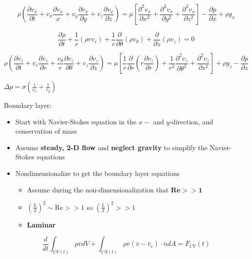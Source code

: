 \begin{equation*}
  \rho\left(\frac{\partial{}v_{x}}{\partial{}t}+v_{x}\frac{\partial{}v_{x}}{x}+v_{y}\frac{\partial{}v_{x}}{\partial{}y}+v_{z}\frac{\partial{}v_{x}}{\partial{}z}\right)=\mu\left[\frac{\partial^{2}v_{x}}{\partial{}x^{2}}+\frac{\partial^{2}v_{x}}{\partial{}y^{2}}+\frac{\partial^{2}v_{x}}{\partial{}z^{2}}\right]-\frac{\partial{}p}{\partial{}x}+\rho{}g_{x}
\end{equation*}

\begin{equation*}
  \frac{\partial\rho}{\partial{}t}+\frac{1}{r}(\rho{}rv_{r})+\frac{1}{r}\frac{\partial}{\partial\theta}(\rho{}v_{\theta})+\frac{\partial}{\partial{}z}(\rho{}v_{z})=0
\end{equation*}

\begin{equation*}
  \rho\left(\frac{\partial{}v_{z}}{\partial{}t}+v_{r}\frac{\partial{}v_{z}}{\partial{}r}+\frac{v_{\theta}}{r}\frac{\partial{}v_{z}}{\partial\theta}+v_{z}\frac{\partial{}v_{z}}{\partial{}z}\right)=\mu\left[\frac{1}{r}\frac{\partial}{\partial{}r}\left(r\frac{\partial{}v_{z}}{\partial{}r}\right)+\frac{1}{r^{2}}\frac{\partial^{2}v_{z}}{\partial\theta^{2}}+\frac{\partial^{2}v_{z}}{\partial{}z^{2}}\right]+\rho{}g_{z}-\frac{\partial{}p}{\partial{}z}
\end{equation*}

$\Delta{}p=\sigma\left(\frac{1}{r_{x}}+\frac{1}{r_{y}}\right)$

Boundary layer:
\begin{itemize}
  \setlength{\itemsep}{-4pt}
  \item{Start with Navier-Stokes equation in the $x-$ and $y$-direction, and conservation of mass}
  \item{Assume \textbf{steady, 2-D flow} and \textbf{neglect gravity} to simplify the Navier-Stokes equations}
  \item{Nondimensionalize to get the boundary layer equations}
  \begin{itemize}
    \item{Assume during the non-dimensionalization that $\textbf{Re}\mathbf{>>1}$}
    \item{$\left(\frac{L}{\delta}\right)^{2}\sim\text{Re}>>1$ so $\left(\frac{L}{\delta}\right)^{2}>>1$}
    \item{\textbf{Laminar}}
  \end{itemize}
\end{itemize}

\begin{equation*}
  \frac{d}{dt}\int_{CV(t)}\rho\overline{v}dV+\int_{CS(t)}\rho\overline{v}(\overline{v}-\overline{v}_{c})\cdot\overline{n}dA=\overline{F}_{CV}(t)
\end{equation*}
